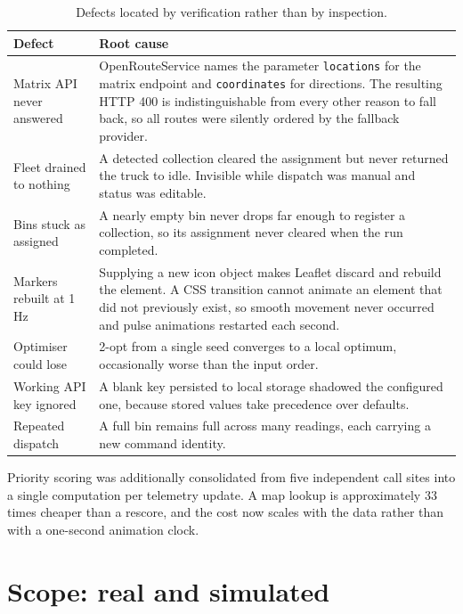 \documentclass[11pt,a4paper]{article}
\begin{document}
\begin{table}[h]
\centering\small
\begin{tabularx}{\textwidth}{lX}
\toprule
\textbf{Defect} & \textbf{Root cause} \\
\midrule
Matrix API never answered &
OpenRouteService names the parameter \texttt{locations} for the matrix
endpoint and \texttt{coordinates} for directions. The resulting HTTP 400
is indistinguishable from every other reason to fall back, so all routes
were silently ordered by the fallback provider. \\
\addlinespace
Fleet drained to nothing &
A detected collection cleared the assignment but never returned the truck
to idle. Invisible while dispatch was manual and status was editable. \\
\addlinespace
Bins stuck as assigned &
A nearly empty bin never drops far enough to register a collection, so its
assignment never cleared when the run completed. \\
\addlinespace
Markers rebuilt at 1\,Hz &
Supplying a new icon object makes Leaflet discard and rebuild the element.
A CSS transition cannot animate an element that did not previously exist,
so smooth movement never occurred and pulse animations restarted each second. \\
\addlinespace
Optimiser could lose &
2-opt from a single seed converges to a local optimum, occasionally worse
than the input order. \\
\addlinespace
Working API key ignored &
A blank key persisted to local storage shadowed the configured one,
because stored values take precedence over defaults. \\
\addlinespace
Repeated dispatch &
A full bin remains full across many readings, each carrying a new command
identity. \\
\bottomrule
\end{tabularx}
\caption{Defects located by verification rather than by inspection.}
\end{table}

Priority scoring was additionally consolidated from five independent call
sites into a single computation per telemetry update. A map lookup is
approximately 33 times cheaper than a rescore, and the cost now scales
with the data rather than with a one-second animation clock.

\section{Scope: real and simulated}
\end{document}
